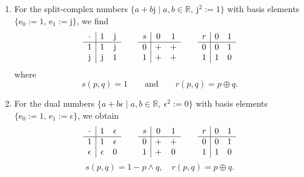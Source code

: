 \documentclass{article}
\begin{document}
\begin{enumerate}
\item For the split-complex numbers $\{a + b\mathrm j \mid a,b \in \mathbb{R},\ \mathrm j^2:=1\}$ with basis elements $\{\mathrm e_0 := 1,\,\mathrm e_1 := \mathrm j \}$, we find
$$ \begin{array}{c | c c}
     \cdot & 1 & \mathrm j\\
     \hline
     1 & 1 & \mathrm j \\
     \mathrm j & \mathrm j & 1 \\
\end{array} \qquad \begin{array}{c | c c}
     s & 0 & 1\\
     \hline
     0 & + & + \\
     1 & + & + \\
\end{array} \qquad \begin{array}{c | c c}
     r & 0 & 1\\
     \hline
     0 & 0 & 1 \\
     1 & 1 & 0 \\
\end{array} $$
where $$ s(p,q) = 1 \qquad \text{and}\qquad r(p,q) = p \oplus q. $$

\item For the dual numbers $\{a + b\epsilon \mid a,b \in \mathbb{R},\ \epsilon^2:=0\}$ with basis elements $\{\mathrm e_0 := 1,\, \mathrm e_1 := \epsilon \}$, we obtain
$$ \begin{array}{c | c c}
    \cdot & 1 & \epsilon\\
     \hline
     1 & 1 & \epsilon \\
     \epsilon & \epsilon & 0 \\
\end{array} \qquad \begin{array}{c | c c}
     s & 0 & 1\\
     \hline
     0 & + & + \\
     1 & + & 0 \\
\end{array} \qquad \begin{array}{c | c c}
     r & 0 & 1\\
     \hline
     0 & 0 & 1 \\
     1 & 1 & 0 \\
\end{array} $$
$$ s(p,q) = 1 - p \wedge q, \quad r(p,q) = p \oplus q. $$


\end{enumerate}
\end{document}
